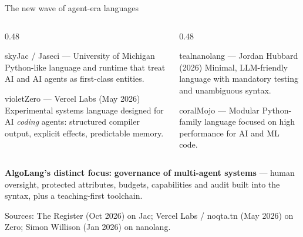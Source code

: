 \documentclass[aspectratio=169,11pt]{beamer}
\begin{document}
\begin{frame}{The new wave of agent-era languages}
\vspace{1mm}
\begin{columns}[T]
\begin{column}{0.48\textwidth}
\begin{card}{sky}{Jac / Jaseci --- University of Michigan}
Python-like language and runtime that treat AI and AI agents as first-class entities.
\end{card}
\begin{card}{violet}{Zero --- Vercel Labs (May 2026)}
Experimental systems language designed for AI \emph{coding} agents: structured compiler output, explicit effects, predictable memory.
\end{card}
\end{column}
\begin{column}{0.48\textwidth}
\begin{card}{teal}{nanolang --- Jordan Hubbard (2026)}
Minimal, LLM-friendly language with mandatory testing and unambiguous syntax.
\end{card}
\begin{card}{coral}{Mojo --- Modular}
Python-family language focused on high performance for AI and ML code.
\end{card}
\end{column}
\end{columns}
\begin{tcolorbox}[enhanced,colback=goldlight,colframe=gold,boxrule=0.6pt,arc=3pt,fontupper=\footnotesize,before skip=1mm,after skip=1mm]
\textbf{\color{navy}AlgoLang's distinct focus:} \textbf{governance of multi-agent systems} --- human oversight, protected attributes, budgets, capabilities and audit built into the syntax, plus a teaching-first toolchain.
\end{tcolorbox}
{\tiny\color{muted} Sources: The Register (Oct 2026) on Jac; Vercel Labs / noqta.tn (May 2026) on Zero; Simon Willison (Jan 2026) on nanolang.}
\end{frame}

\end{document}
